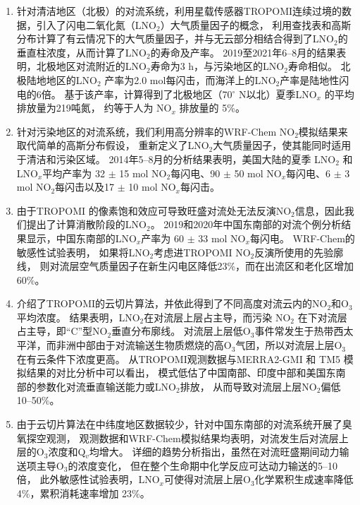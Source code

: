 \begin{enumerate}[label=（\arabic*）, labelindent=\parindent, leftmargin=0pt, widest=0, itemindent=*, topsep=0pt, partopsep=0pt, parsep=0pt]

\item 针对清洁地区（北极）的对流系统，利用星载传感器TROPOMI连续过境的数据，引入了闪电二氧化氮（LNO$_2$）大气质量因子的概念，
利用查找表和高斯分布计算了有云情况下的大气质量因子，并与无云部分相结合得到了LNO$_2$的垂直柱浓度，从而计算了LNO$_2$的寿命及产率。
2019至2021年6--8月的结果表明，北极地区对流附近的LNO$_2$寿命为3 h，与污染地区的LNO$_2$寿命相似。
北极陆地地区的LNO$_2$ 产率为2.0 mol每闪击，而海洋上的LNO$_2$产率是陆地性闪电的6倍。
基于该产率，计算得到了北极地区（70$^{\circ}$ N以北）夏季LNO$_x$ 的平均排放量为219吨氮，
约等于人为 NO$_x$ 排放量的 5\%。

\item 针对污染地区的对流系统，我们利用高分辨率的WRF-Chem NO$_2$模拟结果来取代简单的高斯分布假设，
重新定义了LNO$_2$大气质量因子，使其能同时适用于清洁和污染区域。
2014年5--8月的分析结果表明，美国大陆的夏季 LNO$_2$ 和 LNO$_x$平均产率为
32 $\pm$ 15 mol NO$_2$每闪电、90 $\pm$ 50 mol NO$_x$每闪电、6 $\pm$ 3 mol NO$_2$每闪击以及17 $\pm$ 10 mol NO$_x$每闪击。

\item 由于TROPOMI 的像素饱和效应可导致旺盛对流处无法反演NO$_2$信息，因此我们提出了计算消散阶段的LNO$_2$。
2019和2020年中国东南部的对流个例分析结果显示，中国东南部的LNO$_x$产率为 60 $\pm$ 33 mol NO$_x$每闪电。
WRF-Chem的敏感性试验表明，
如果将LNO$_2$考虑进TROPOMI NO$_2$反演所使用的先验廓线，
则对流层空气质量因子在新生闪电区降低23\%，而在出流区和老化区增加60\%。

\item 介绍了TROPOMI的云切片算法，并依此得到了不同高度对流云内的NO$_2$和O$_3$平均浓度。
结果表明，LNO$_2$在对流层上层占主导，而污染 NO$_2$ 在下对流层占主导，即“C”型NO$_2$垂直分布廓线。
对流层上层低O$_3$事件常发生于热带西太平洋，而非洲中部由于对流输送生物质燃烧的高O$_3$气团，所以对流层上层O$_3$在有云条件下浓度更高。
从TROPOMI观测数据与MERRA2-GMI 和 TM5 模拟结果的对比分析中可以看出，
模式低估了中国南部、印度中部和美国东南部的参数化对流垂直输送能力或LNO$_2$排放，
从而导致对流层上层NO$_2$偏低10--50\%。

\item 由于云切片算法在中纬度地区数据较少，针对中国东南部的对流系统开展了臭氧探空观测，
观测数据和WRF-Chem模拟结果均表明，对流发生后对流层上层的O$_3$浓度和Q$_v$均增大。
详细的趋势分析指出，虽然在对流旺盛期间动力输送项主导O$_3$的浓度变化，
但在整个生命期中化学反应可达动力输送的5--10倍，
此外敏感性试验表明，LNO$_x$可使得对流层上层O$_3$化学累积生成速率降低 4\%，累积消耗速率增加 23\%。

\end{enumerate}

